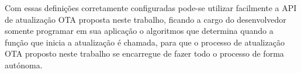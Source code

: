 Com essas definições corretamente configuradas pode-se utilizar facilmente a API de atualização OTA proposta neste trabalho, ficando a cargo do desenvolvedor somente programar em sua aplicação o algoritmos que determina quando a função que inicia a atualização é chamada, para que o processo de atualização OTA proposto neste trabalho se encarregue de fazer todo o processo de forma autónoma. 


